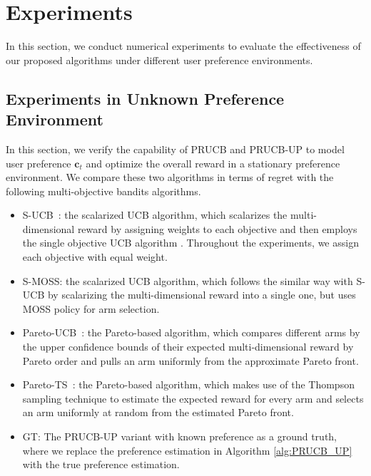 \section{Experiments}
\label{sec:app_exp}

In this section, we conduct numerical experiments to evaluate the effectiveness of our proposed algorithms under different user preference environments.

\subsection{Experiments in Unknown Preference Environment}
\label{sec:app_exp_prucb_static}

In this section, we verify the capability of PRUCB and PRUCB-UP to model user preference $\boldsymbol{c}_t$ and optimize the overall reward in a stationary preference environment. 
We compare these two algorithms in terms of regret with the following multi-objective bandits algorithms.
\vspace{-5pt}
\begin{itemize}[leftmargin=*]
\item 
S-UCB~\cite{drugan2013designing}:
the scalarized UCB algorithm, which scalarizes the multi-dimensional reward by assigning weights to each objective and then employs the single objective UCB algorithm \cite{auer2002finite}. Throughout the experiments, we assign each objective with equal weight. 
\item 
S-MOSS:
the scalarized UCB algorithm, which follows the similar way with S-UCB by scalarizing the multi-dimensional reward into a single one, but uses MOSS \cite{audibert2009minimax} policy for arm selection.
\item 
Pareto-UCB~\cite{drugan2013designing}:
the Pareto-based algorithm, which compares different arms by the upper confidence bounds of their expected multi-dimensional reward by Pareto order and pulls an arm uniformly from the approximate Pareto front.
\item 
Pareto-TS~\cite{yahyaa2015thompson}:
the Pareto-based algorithm, which makes use of the Thompson sampling technique to estimate the expected reward for every arm and selects an arm uniformly at random from the estimated Pareto front.
\item 
GT:
The PRUCB-UP variant with known preference as a ground truth, where we replace the preference estimation in Algorithm \ref{alg:PRUCB_UP} with the true preference estimation.
\end{itemize}


